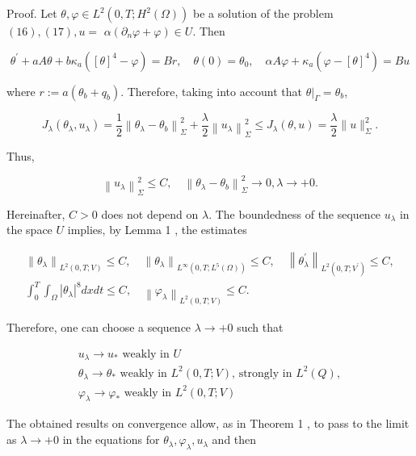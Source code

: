 \documentclass[10pt]{article}
\begin{document}
Proof. Let $\theta, \varphi \in L^{2}\left(0, T ; H^{2}(\Omega)\right)$ be a solution of the problem $(16),(17), u=$ $\alpha\left(\partial_{n} \varphi+\varphi\right) \in U$. Then

$$
\theta^{\prime}+a A \theta+b \kappa_{a}\left([\theta]^{4}-\varphi\right)=B r, \quad \theta(0)=\theta_{0}, \quad \alpha A \varphi+\kappa_{a}\left(\varphi-[\theta]^{4}\right)=B u
$$

where $r:=a\left(\theta_{b}+q_{b}\right)$. Therefore, taking into account that $\left.\theta\right|_{\Gamma}=\theta_{b}$,

$$
J_{\lambda}\left(\theta_{\lambda}, u_{\lambda}\right)=\frac{1}{2}\left\|\theta_{\lambda}-\theta_{b}\right\|_{\Sigma}^{2}+\frac{\lambda}{2}\left\|u_{\lambda}\right\|_{\Sigma}^{2} \leq J_{\lambda}(\theta, u)=\frac{\lambda}{2}\|u\|_{\Sigma}^{2} .
$$

Thus,

$$
\left\|u_{\lambda}\right\|_{\Sigma}^{2} \leq C, \quad\left\|\theta_{\lambda}-\theta_{b}\right\|_{\Sigma}^{2} \rightarrow 0, \lambda \rightarrow+0 .
$$

Hereinafter, $C>0$ does not depend on $\lambda$. The boundedness of the sequence $u_{\lambda}$ in the space $U$ implies, by Lemma 1 , the estimates

$$
\begin{gathered}
\left\|\theta_{\lambda}\right\|_{L^{2}(0, T ; V)} \leq C, \quad\left\|\theta_{\lambda}\right\|_{L^{\infty}\left(0, T ; L^{5}(\Omega)\right)} \leq C, \quad\left\|\theta_{\lambda}^{\prime}\right\|_{L^{2}\left(0, T ; V^{\prime}\right)} \leq C, \\
\int_{0}^{T} \int_{\Omega}\left|\theta_{\lambda}\right|^{8} d x d t \leq C, \quad\left\|\varphi_{\lambda}\right\|_{L^{2}(0, T ; V)} \leq C .
\end{gathered}
$$

Therefore, one can choose a sequence $\lambda \rightarrow+0$ such that

$$
\begin{gathered}
u_{\lambda} \rightarrow u_{*} \text { weakly in } U \\
\theta_{\lambda} \rightarrow \theta_{*} \text { weakly in } L^{2}(0, T ; V) \text {, strongly in } L^{2}(Q), \\
\varphi_{\lambda} \rightarrow \varphi_{*} \text { weakly in } L^{2}(0, T ; V)
\end{gathered}
$$

The obtained results on convergence allow, as in Theorem 1 , to pass to the limit as $\lambda \rightarrow+0$ in the equations for $\theta_{\lambda}, \varphi_{\lambda}, u_{\lambda}$ and then
\end{document}
